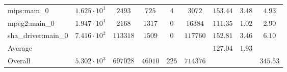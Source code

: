 \begin{tabular}{|l|c|c|c|c|c|c|c|c|}
mips:main\_0            & $ 1.625 \cdot 10^{1}  $ & $ 2493   $ & $ 725   $ & $ 4   $ & $ 3072   $ & $ 153.44      $ & $ 3.48    $ & $ 4.93    $ \\
mpeg2:main\_0           & $ 1.947 \cdot 10^{1}  $ & $ 2168   $ & $ 1317  $ & $ 0   $ & $ 16384  $ & $ 111.35      $ & $ 1.02    $ & $ 2.90    $ \\
sha\_driver:main\_0     & $ 7.416 \cdot 10^{2}  $ & $ 113318 $ & $ 1509  $ & $ 0   $ & $ 117760 $ & $ 152.81      $ & $ 3.46    $ & $ 6.10    $ \\
\hline
Average                 & $                     $ & $        $ & $       $ & $     $ & $        $ & $ 127.04      $ & $ 1.93    $ & $         $ \\
\hline
Overall                 & $ 5.302 \cdot 10^{3}  $ & $ 697028 $ & $ 46010 $ & $ 225 $ & $ 714376 $ & $             $ & $         $ & $ 345.53  $ \\
\hline
\end{tabular}
